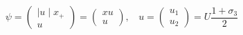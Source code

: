 \begin{equation}
\psi = \left(
\begin{array}{c}
\mid u\mid x_{+}\\
u
\end{array}
\right)= \left(
\begin{array}{c}
xu\\
u
\end{array}
\right),~~~~u = \left(
\begin{array}{c}
u_{1}\\
u_{2}
\end{array}
\right)= U \frac{1+\sigma_{3}}{2}
\end{equation}


